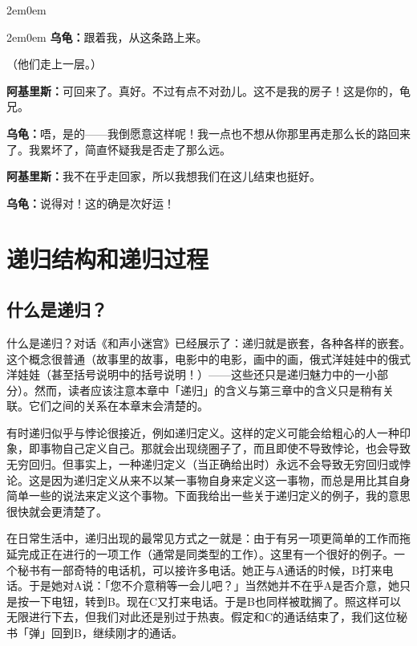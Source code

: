 \documentclass[
  12pt,
  twoside,
  openright,
  oldfontcommands,
]{memoir}
\newcommand{\dialogname}[1]{{\heifamily\bfseries #1}}
\begin{document}
\begin{adjustwidth}{2em}{0em}
\begin{adjustwidth}{2em}{0em}
\dialogname{乌龟：}跟着我，从这条路上来。

（他们走上一层。）

\end{adjustwidth}

\dialogname{阿基里斯：}可回来了。真好。不过有点不对劲儿。这不是我的房子！这是你的，龟兄。

\dialogname{乌龟：}唔，是的------我倒愿意这样呢！我一点也不想从你那里再走那么长的路回来了。我累坏了，简直怀疑我是否走了那么远。

\dialogname{阿基里斯：}我不在乎走回家，所以我想我们在这儿结束也挺好。

\dialogname{乌龟：}说得对！这的确是次好运！

\end{adjustwidth}

\label{Chapter05.xhtml}{}

\chapter{递归结构和递归过程}

\section{什么是递归？}

什么是递归？对话《和声小迷宫》已经展示了：递归就是嵌套，各种各样的嵌套。这个概念很普通（故事里的故事，电影中的电影，画中的画，俄式洋娃娃中的俄式洋娃娃（甚至括号说明中的括号说明！）------这些还只是递归魅力中的一小部分）。然而，读者应该注意本章中「递归」的含义与第三章中的含义只是稍有关联。它们之间的关系在本章末会清楚的。

有时递归似乎与悖论很接近，例如递归定义。这样的定义可能会给粗心的人一种印象，即事物自己定义自己。那就会出现绕圈子了，而且即使不导致悖论，也会导致无穷回归。但事实上，一种递归定义（当正确给出时）永远不会导致无穷回归或悖论。这是因为递归定义从来不以某一事物自身来定义这一事物，而总是用比其自身简单一些的说法来定义这个事物。下面我给出一些关于递归定义的例子，我的意思很快就会更清楚了。

在日常生活中，递归出现的最常见方式之一就是：由于有另一项更简单的工作而拖延完成正在进行的一项工作（通常是同类型的工作）。这里有一个很好的例子。一个秘书有一部奇特的电话机，可以接许多电话。她正与A通话的时候，B打来电话。于是她对A说：「您不介意稍等一会儿吧？」当然她并不在乎A是否介意，她只是按一下电钮，转到B。现在C又打来电话。于是B也同样被耽搁了。照这样可以无限进行下去，但我们对此还是别过于热衷。假定和C的通话结束了，我们这位秘书「弹」回到B，继续刚才的通话。
\end{document}
